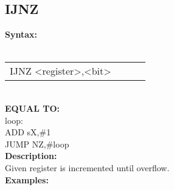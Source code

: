                 \subsection{IJNZ}
                \textbf{Syntax:}\\
                \\ {
                    \texttt{}
                    \begin{tabular}[h!]{llll}
                            { \color{highlight_instruction} IJNZ   } { \color{highlight_symbol} <register>,<bit> }
                            { \color{highlight_comment}  }\\
                    \end{tabular}
                    }\\
                    \textbf{EQUAL TO:}\\
                    { \color{highlight_label} loop:    } { \color{highlight_symbol}       }\\
                    { \color{highlight_instruction} ADD    } { \color{highlight_symbol}      sX,\#1 }\\
                    { \color{highlight_instruction} JUMP    } { \color{highlight_symbol}     NZ,\#loop }\\
                \textbf{Description:}\\
                Given register is incremented until overflow.\\
                \textbf{Examples:}\\
                        \begin{code}[h!]
                        symbol}\verb'loop:          ' }\\
                        symbol}\verb'IJNZ          s0,loop' }\\
                        \end{code}
